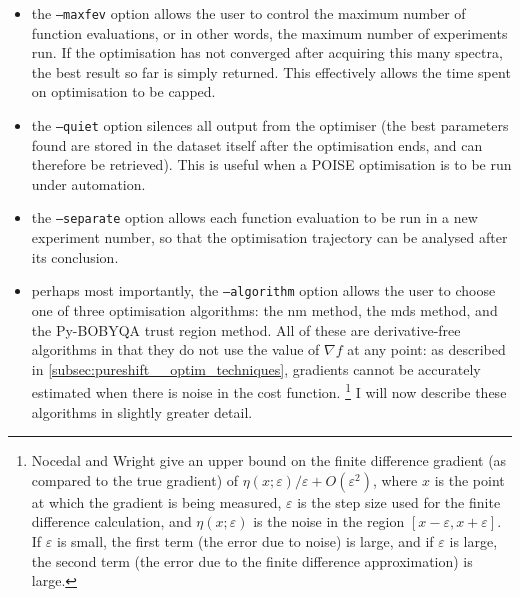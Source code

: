 \begin{itemize}
    \item the \texttt{--maxfev} option allows the user to control the maximum number of function evaluations, or in other words, the maximum number of experiments run.
        If the optimisation has not converged after acquiring this many spectra, the best result so far is simply returned.
        This effectively allows the time spent on optimisation to be capped.

    \item the \texttt{--quiet} option silences all output from the optimiser (the best parameters found are stored in the dataset itself after the optimisation ends, and can therefore be retrieved).
        This is useful when a POISE optimisation is to be run under automation.
        
    \item the \texttt{--separate} option allows each function evaluation to be run in a new experiment number, so that the optimisation trajectory can be analysed after its conclusion.

    \item perhaps most importantly, the \texttt{--algorithm} option allows the user to choose one of three optimisation algorithms: the \acf{nm} method\autocite{Nelder1965TCJ}, the \acf{mds} method\autocite{Torczon1989,DennisJr1991SIAMJO}, and the Py-BOBYQA trust region method\autocite{Powell2009Proc,Cartis2019ACMTMS}.
        All of these are derivative-free algorithms in that they do not use the value of $\nabla f$ at any point: as described in \cref{subsec:pureshift__optim_techniques}, gradients cannot be accurately estimated when there is noise in the cost function.%
        \footnote{Nocedal and Wright\autocite{Nocedal2006} give an upper bound on the finite difference gradient (as compared to the true gradient) of $\eta(x;\varepsilon)/\varepsilon + O(\varepsilon^2)$, where $x$ is the point at which the gradient is being measured, $\varepsilon$ is the step size used for the finite difference calculation, and $\eta(x;\varepsilon)$ is the noise in the region $[x - \varepsilon, x + \varepsilon]$. If $\varepsilon$ is small, the first term (the error due to noise) is large, and if $\varepsilon$ is large, the second term (the error due to the finite difference approximation) is large.}
        I will now describe these algorithms in slightly greater detail.
\end{itemize}

